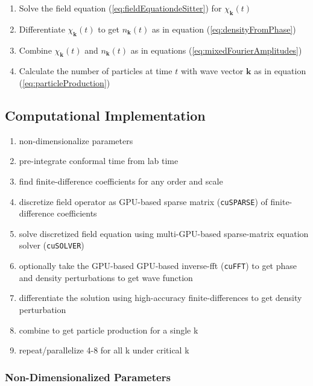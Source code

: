 \documentclass{article}
\begin{document}
            \begin{enumerate}
                \item Solve the field equation (\ref{eq:fieldEquationdeSitter}) for $\chi_\mathbf{k}(t)$
                \item Differentiate $\chi_\mathbf{k}(t)$ to get $n_\mathbf{k}(t)$ as in equation (\ref{eq:densityFromPhase})
                \item Combine $\chi_\mathbf{k}(t)$ and $n_\mathbf{k}(t)$ as in equations (\ref{eq:mixedFourierAmplitudes})
                \item Calculate the number of particles at time $t$ with wave vector $\mathbf{k}$ as in equation (\ref{eq:particleProduction})
            \end{enumerate}

    \subsection{Computational Implementation}

        \begin{enumerate}
            \item non-dimensionalize parameters
            \item pre-integrate conformal time from lab time
            \item find finite-difference coefficients for any order and scale
            \item discretize field operator as GPU-based sparse matrix (\verb|cuSPARSE|) of finite-difference coefficients
            \item solve discretized field equation using multi-GPU-based sparse-matrix equation solver (\verb|cuSOLVER|)
            \item optionally take the GPU-based GPU-based inverse-fft (\verb|cuFFT|) to get phase and density perturbations to get wave function
            \item differentiate the solution using high-accuracy finite-differences to get density perturbation
            \item combine to get particle production for a single k
            \item repeat/parallelize 4-8 for all k under critical k
        \end{enumerate}

        \subsubsection{Non-Dimensionalized Parameters}
\end{document}
